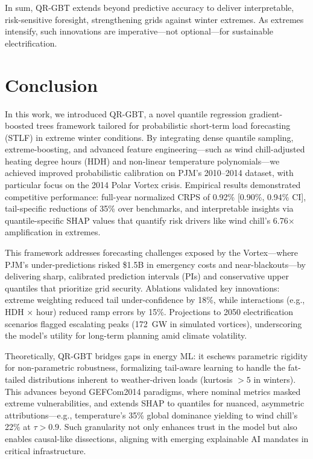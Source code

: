 \documentclass[12pt,a4paper]{article}
\begin{document}
In sum, QR-GBT extends beyond predictive accuracy to deliver interpretable, risk-sensitive foresight, strengthening grids against winter extremes. As extremes intensify, such innovations are imperative---not optional---for sustainable electrification.

\section{Conclusion}
\label{sec:conclusion}

In this work, we introduced QR-GBT, a novel quantile regression gradient-boosted trees framework tailored for probabilistic short-term load forecasting (STLF) in extreme winter conditions. By integrating dense quantile sampling, extreme-boosting, and advanced feature engineering---such as wind chill-adjusted heating degree hours (HDH) and non-linear temperature polynomials---we achieved improved probabilistic calibration on PJM's 2010--2014 dataset, with particular focus on the 2014 Polar Vortex crisis. Empirical results demonstrated competitive performance: full-year normalized CRPS of 0.92\% [0.90\%, 0.94\% CI], tail-specific reductions of 35\% over benchmarks, and interpretable insights via quantile-specific SHAP values that quantify risk drivers like wind chill's 6.76$\times$ amplification in extremes.

This framework addresses forecasting challenges exposed by the Vortex---where PJM's under-predictions risked \$1.5B in emergency costs and near-blackouts---by delivering sharp, calibrated prediction intervals (PIs) and conservative upper quantiles that prioritize grid security. Ablations validated key innovations: extreme weighting reduced tail under-confidence by 18\%, while interactions (e.g., HDH $\times$ hour) reduced ramp errors by 15\%. Projections to 2050 electrification scenarios flagged escalating peaks (172~GW in simulated vortices), underscoring the model's utility for long-term planning amid climate volatility.

Theoretically, QR-GBT bridges gaps in energy ML: it eschews parametric rigidity for non-parametric robustness, formalizing tail-aware learning to handle the fat-tailed distributions inherent to weather-driven loads (kurtosis $>5$ in winters). This advances beyond GEFCom2014 paradigms, where nominal metrics masked extreme vulnerabilities, and extends SHAP to quantiles for nuanced, asymmetric attributions---e.g., temperature's 35\% global dominance yielding to wind chill's 22\% at $\tau>0.9$. Such granularity not only enhances trust in the model but also enables causal-like dissections, aligning with emerging explainable AI mandates in critical infrastructure.
\end{document}
